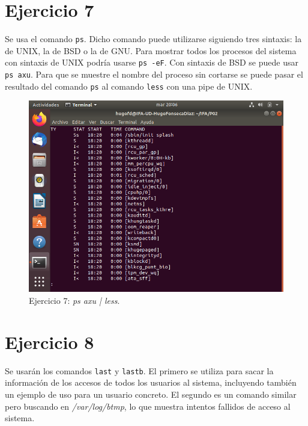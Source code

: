 \documentclass[11pt]{article}
\begin{document}
\section{Ejercicio 7}
Se usa el comando \verb|ps|. Dicho comando puede utilizarse siguiendo tres sintaxis: la de UNIX, la de BSD o la de GNU. Para mostrar todos los procesos del sistema con sintaxis de UNIX podría usarse \verb|ps -eF|. Con sintaxis de BSD se puede usar \verb|ps axu|. Para que se muestre el nombre del proceso sin cortarse se puede pasar el resultado del comando \verb|ps| al comando \verb|less| con una pipe de UNIX.

\begin{figure}[H]
    \caption{Ejercicio 7: \textit{ps axu | less}.}
  \centering
  \includegraphics[scale=0.7]{e7.png}
\end{figure}

\section{Ejercicio 8}
Se usarán los comandos \verb|last| y \verb|lastb|. El primero se utiliza para sacar la información de los accesos de todos los usuarios al sistema, incluyendo también un ejemplo de uso para un usuario concreto. El segundo es un comando similar pero buscando en \textit{/var/log/btmp}, lo que muestra intentos fallidos de acceso al sistema.
\end{document}
